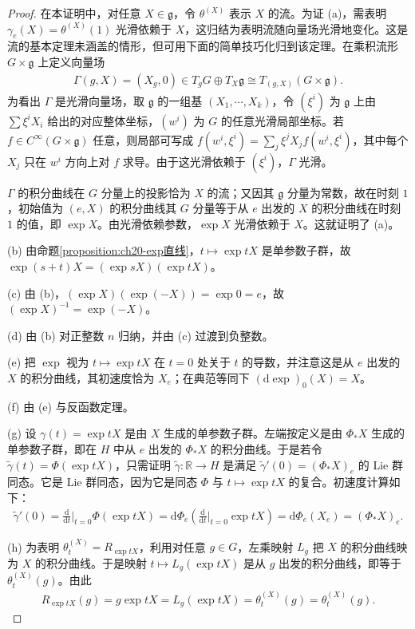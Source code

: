 \documentclass[../../main.tex]{subfiles}
\begin{document}
\begin{proof}
在本证明中，对任意 $X\in\mathfrak g$，令 $\theta^{(X)}$ 表示 $X$ 的流。为证 (a)，需表明 $\gamma_e(X)=\theta^{(X)}(1)$ 光滑依赖于 $X$，这归结为表明流随向量场光滑地变化。这是流的基本定理未涵盖的情形，但可用下面的简单技巧化归到该定理。在乘积流形 $G\times\mathfrak g$ 上定义向量场
\begin{align*}
\Gamma(g,X)=(X_g,0)\in T_gG\oplus T_X\mathfrak g\cong T_{(g,X)}(G\times\mathfrak g).
\end{align*}
为看出 $\Gamma$ 是光滑向量场，取 $\mathfrak g$ 的一组基 $(X_1,\cdots ,X_k)$，令 $(\xi^i)$ 为 $\mathfrak g$ 上由 $\sum\xi^iX_i$ 给出的对应整体坐标，$(w^i)$ 为 $G$ 的任意光滑局部坐标。若 $f\in C^\infty(G\times\mathfrak g)$ 任意，则局部可写成 $f(w^i,\xi^i)=\sum_j\xi^jX_jf(w^i,\xi^i)$，其中每个 $X_j$ 只在 $w^i$ 方向上对 $f$ 求导。由于这光滑依赖于 $(\xi^i)$，$\Gamma$ 光滑。

$\Gamma$ 的积分曲线在 $G$ 分量上的投影恰为 $X$ 的流；又因其 $\mathfrak g$ 分量为常数，故在时刻 $1$，初始值为 $(e,X)$ 的积分曲线其 $G$ 分量等于从 $e$ 出发的 $X$ 的积分曲线在时刻 $1$ 的值，即 $\exp X$。由光滑依赖参数，$\exp X$ 光滑依赖于 $X$。这就证明了 (a)。

(b) 由命题\cref{proposition:ch20-exp直线}，$t\mapsto\exp tX$ 是单参数子群，故 $\exp(s+t)X=(\exp sX)(\exp tX)$。

(c) 由 (b)，$(\exp X)(\exp(-X))=\exp 0=e$，故 $(\exp X)^{-1}=\exp(-X)$。

(d) 由 (b) 对正整数 $n$ 归纳，并由 (c) 过渡到负整数。

(e) 把 $\exp$ 视为 $t\mapsto\exp tX$ 在 $t=0$ 处关于 $t$ 的导数，并注意这是从 $e$ 出发的 $X$ 的积分曲线，其初速度恰为 $X_e$；在典范等同下 $(\mathrm{d}\exp)_0(X)=X$。

(f) 由 (e) 与反函数定理。

(g) 设 $\gamma(t)=\exp tX$ 是由 $X$ 生成的单参数子群。左端按定义是由 $\Phi_*X$ 生成的单参数子群，即在 $H$ 中从 $e$ 出发的 $\Phi_*X$ 的积分曲线。于是若令 $\widetilde\gamma(t)=\Phi(\exp tX)$，只需证明 $\widetilde\gamma\colon\mathbb{R}\to H$ 是满足 $\widetilde\gamma'(0)=(\Phi_*X)_e$ 的 Lie 群同态。它是 Lie 群同态，因为它是同态 $\Phi$ 与 $t\mapsto\exp tX$ 的复合。初速度计算如下：
\begin{align*}
\widetilde\gamma'(0)=\frac{\mathrm{d}}{\mathrm{d}t}\bigg|_{t=0}\Phi(\exp tX)=\mathrm{d}\Phi_e\left(\frac{\mathrm{d}}{\mathrm{d}t}\bigg|_{t=0}\exp tX\right)=\mathrm{d}\Phi_e(X_e)=(\Phi_*X)_e.
\end{align*}

(h) 为表明 $\theta^{(X)}_t=R_{\exp tX}$，利用对任意 $g\in G$，左乘映射 $L_g$ 把 $X$ 的积分曲线映为 $X$ 的积分曲线。于是映射 $t\mapsto L_g(\exp tX)$ 是从 $g$ 出发的积分曲线，即等于 $\theta^{(X)}_t(g)$。由此
\begin{align*}
R_{\exp tX}(g)=g\exp tX=L_g(\exp tX)=\theta^{(X)}_t(g)=\theta^{(X)}_t(g).
\end{align*}
\end{proof}
\end{document}
